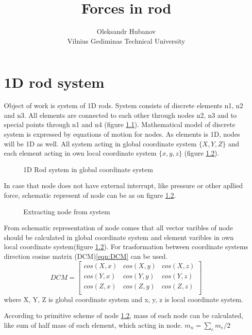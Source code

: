 \documentclass[12pt]{report}
\begin{document}
\title{Forces in rod}
\author{Oleksandr Hubanov\\
Vilnius Gediminas Technical University}
\maketitle
\pagebreak
\chapter {1D rod system}\par
Object of work is system of 1D rods. System consists of discrete elements n1, n2 and n3.
All elements are connected to each other through nodes n2, n3 and to special points through n1 and n4
(figure \ref{fig:rodSystem}). Mathematical model of discrete system is expressed by equations of motion for nodes.
As elements is 1D, nodes will be 1D as well. All system acting in global coordinate system $\{X, Y, Z\}$ and each 
element acting in own local coordinate system $\{x,y,z\}$ (figure \ref{fig:nodeExtract}).\par
\begin{figure}[ht]
  \centering
      
  \caption{1D Rod system in global coordinate system}\label{fig:rodSystem}      
\end{figure}
In case that node does not have external interrupt, like pressure or other apllied force, schematic represent of node
can be as on figure \ref{fig:nodeExtract}.\par
\begin{figure}[ht]
  \centering
      
  \caption{Extracting node from system}\label{fig:nodeExtract}
\end{figure}
From schematic representation of node comes that all vector varibles of node should be calculated in global coordinate 
system and element varibles in own local coordinate system(figure \ref{fig:nodeExtract}). For trasformation between 
coordinate systems direction cosine matrix (DCM)\eqref{eqn:DCM} can be used.
\begin{equation}\label{eqn:DCM}
  DCM= \begin{bmatrix}
    cos(X,x)&cos(X,y)&cos(X,z)\\
    cos(Y,x)&cos(Y,y)&cos(Y,z)\\
    cos(Z,x)&cos(Z,y)&cos(Z,z)\\
   \end{bmatrix} 
\end{equation}
where {X, Y, Z} is global coordinate system and {x, y, z} is local coordinate system.\par
According to primitive scheme of node \ref{fig:nodeExtract}, mass of each node can be calculated,
like sum of half mass of each element, which acting in node.
$m_n=\sum_{e}m_e/2$\par
\end{document}
